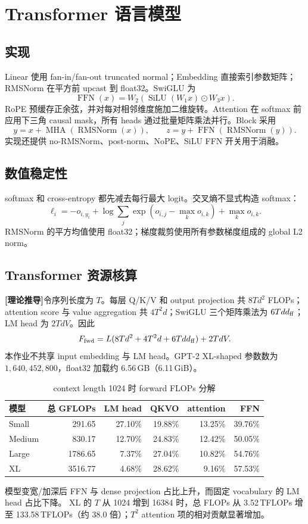 \documentclass[UTF8,a4paper,11pt]{ctexart}
\newcommand{\derived}{\textbf{[理论推导]}}
\begin{document}
\section{Transformer 语言模型}
\subsection{实现}
Linear 使用 fan-in/fan-out truncated normal；Embedding 直接索引参数矩阵；RMSNorm 在平方前
upcast 到 float32。SwiGLU 为
\[
\operatorname{FFN}(x)=W_2\left(\operatorname{SiLU}(W_1x)\odot W_3x\right).
\]
RoPE 预缓存正余弦，并对每对相邻维度施加二维旋转。Attention 在 softmax 前应用下三角 causal
mask，所有 heads 通过批量矩阵乘法并行。Block 采用
\[
y=x+\operatorname{MHA}(\operatorname{RMSNorm}(x)),\qquad
z=y+\operatorname{FFN}(\operatorname{RMSNorm}(y)).
\]
实现还提供 no-RMSNorm、post-norm、NoPE、SiLU FFN 开关用于消融。

\subsection{数值稳定性}
softmax 和 cross-entropy 都先减去每行最大 logit。交叉熵不显式构造 softmax：
\[
\ell_i=-o_{i,y_i}+\log\sum_j\exp(o_{i,j}-\max_k o_{i,k})+\max_k o_{i,k}.
\]
RMSNorm 的平方均值使用 float32；梯度裁剪使用所有参数梯度组成的 global L2 norm。

\subsection{Transformer 资源核算}
\derived 令序列长度为 $T$。每层 Q/K/V 和 output projection 共
$8Td^2$ FLOPs；attention score 与 value aggregation 共 $4T^2d$；SwiGLU 三个矩阵乘法为
$6Tdd_{\rm ff}$；LM head 为 $2TdV$。因此
\[
F_{\rm fwd}=L(8Td^2+4T^2d+6Tdd_{\rm ff})+2TdV.
\]
本作业不共享 input embedding 与 LM head。GPT-2 XL-shaped 参数数为
$1{,}640{,}452{,}800$，float32 加载约 6.56\,GB（6.11\,GiB）。

\begin{table}[ht]
\centering
\caption{context length 1024 时 forward FLOPs 分解}
\begin{tabular}{lrrrrr}
\toprule
模型 & 总 GFLOPs & LM head & QKVO & attention & FFN\\
\midrule
Small  & 291.65  & 27.10\% & 19.88\% & 13.25\% & 39.76\%\\
Medium & 830.17  & 12.70\% & 24.83\% & 12.42\% & 50.05\%\\
Large  & 1786.65 &  7.37\% & 27.04\% & 10.82\% & 54.76\%\\
XL     & 3516.77 &  4.68\% & 28.62\% &  9.16\% & 57.53\%\\
\bottomrule
\end{tabular}
\end{table}
模型变宽/加深后 FFN 与 dense projection 占比上升，而固定 vocabulary 的 LM head 占比下降。
XL 的 $T$ 从 1024 增到 16384 时，总 FLOPs 从 3.52\,TFLOPs 增至 133.58\,TFLOPs（约
38.0 倍）；$T^2$ attention 项的相对贡献显著增加。
\end{document}
